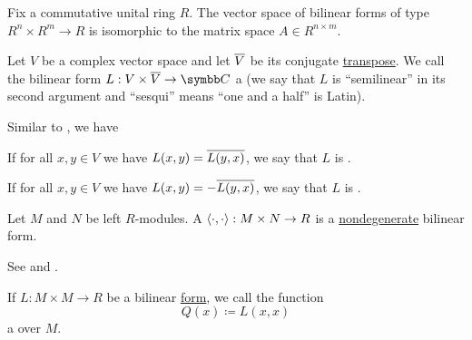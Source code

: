 \begin{corollary}\label{thm:bilinear_forms_isomorphic_to_matrices}
  Fix a commutative unital ring \( R \). The vector space of bilinear forms of type \( R^n \times R^m \to R \) is isomorphic to the matrix space \( A \in R^{n \times m} \).
\end{corollary}

\begin{definition}\label{def:sesquilinear_form}
  Let \( V \) be a complex vector space and let \( \overline{V} \) be its conjugate \hyperref[def:complex_conjucate_vector_space]{transpose}. We call the bilinear form \( L: V \times \Ol V \to \BC \) a  (we say that \( L \) is \enquote{semilinear} in its second argument and \enquote{sesqui} means \enquote{one and a half} is Latin).

  Similar to , we have
  \begin{DefEnum}
     If for all \( x, y \in V \) we have \( L(x, y) = \overline{L(y, x)} \), we say that \( L \) is .

     If for all \( x, y \in V \) we have \( L(x, y) = -\overline{L(y, x)} \), we say that \( L \) is .
  \end{DefEnum}
\end{definition}

\begin{definition}\label{def:duality_pairing}
  Let \( M \) and \( N \) be left \( R \)-modules. A  \( \left\langle \cdot, \cdot \right\rangle: M \times N \to R \) is a \hyperref[def:nondegenerate_bilinear_form]{nondegenerate} bilinear form.

  See  and .
\end{definition}

\begin{definition}\label{def:quadratic_form}
  If \( L: M \times M \to R \) be a bilinear \hyperref[def:bilinear_form]{form}, we call the function
  \begin{equation*}
    Q(x) \coloneqq L(x, x)
  \end{equation*}
  a  over \( M \).
\end{definition}

\begin{definition}\label{def:quadratic_form_definiteness}
\end{definition}

